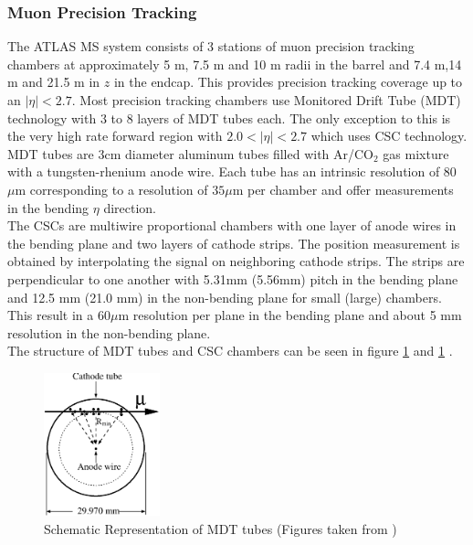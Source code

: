 \subsubsection*{Muon Precision Tracking}

\indent The ATLAS MS system consists of 3 stations of muon precision tracking chambers at approximately 5 m, 7.5 m and 10 m radii in the barrel and 7.4 m,14 m and 21.5 m in $z$ in the endcap.  This provides precision tracking coverage up to an $|\eta| < 2.7$.  Most precision tracking chambers use Monitored Drift Tube (MDT) technology with 3 to 8 layers of MDT tubes each.  The only exception to this is the very high rate forward region with $2.0 < |\eta| < 2.7$ which uses CSC technology. \\

\indent  MDT tubes are 3cm diameter aluminum tubes filled with Ar/CO$_2$ gas mixture with a tungsten-rhenium anode wire.  Each tube has an intrinsic resolution of 80 $\mu$m corresponding to a resolution of $35 \mu$m per chamber and offer measurements in the bending $\eta$ direction.  \\

\indent The CSCs are multiwire proportional chambers with one layer of anode wires in the bending plane and two layers of cathode strips. The position measurement is obtained by interpolating the signal on neighboring cathode strips. The strips are perpendicular to one another with 5.31mm (5.56mm) pitch in the bending plane and 12.5 mm (21.0 mm) in the non-bending plane for small (large) chambers.   This result in a $60 \mu$m resolution per plane in the bending plane and about 5 mm resolution in the non-bending plane. \\ %

\indent The structure of MDT tubes and CSC chambers can be seen in figure \ref{LHC:fig:MDT} and \ref{LHC:fig:MDT} . \\

\begin{figure}[h!]
\centering
\includegraphics[width=0.30\textwidth, angle=0]{figures/LHC_ATLAS/MDT_tube_cross_section.eps}
\caption{ Schematic Representation of MDT tubes (Figures taken from \cite{ATLAS_JINST}) \label{LHC:fig:MDT}}
\end{figure}

